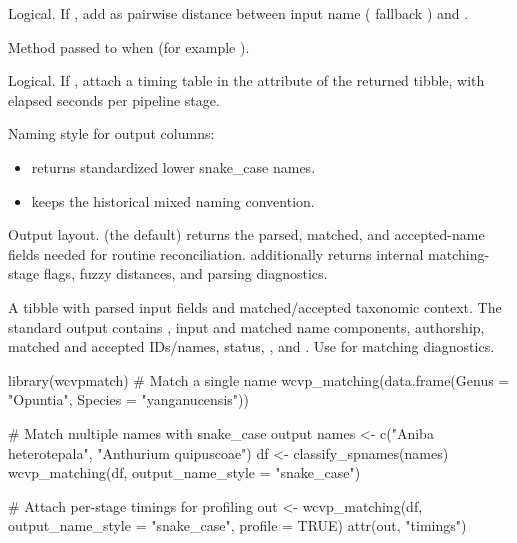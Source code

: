 \documentclass[a4paper]{book}
\begin{document}
\begin{Arguments}
\begin{ldescription}
\begin{itemize}
\end{itemize}


\item[\code{add\_name\_distance}] Logical. If , add
 as pairwise distance between input name
( fallback ) and .

\item[\code{name\_distance\_method}] Method passed to 
when  (for example ).

\item[\code{profile}] Logical. If , attach a timing table in the
 attribute of the returned tibble, with elapsed seconds per
pipeline stage.

\item[\code{output\_name\_style}] Naming style for output columns:
\begin{itemize}

\item{}  returns standardized lower snake\_case names.
\item{}  keeps the historical mixed naming convention.

\end{itemize}


\item[\code{output}] Output layout.  (the default) returns the parsed,
matched, and accepted-name fields needed for routine reconciliation.
 additionally returns internal matching-stage flags, fuzzy
distances, and parsing diagnostics.
\end{ldescription}
\end{Arguments}
%
\begin{Value}
A tibble with parsed input fields and matched/accepted taxonomic
context. The standard output contains , input and matched
name components, authorship, matched and accepted IDs/names, status,
, and . Use  for matching
diagnostics.
\end{Value}
%
\begin{Examples}
\begin{ExampleCode}


library(wcvpmatch)
# Match a single name
wcvp_matching(data.frame(Genus = "Opuntia", Species = "yanganucensis"))

# Match multiple names with snake_case output
names <- c("Aniba heterotepala", "Anthurium quipuscoae")
df <- classify_spnames(names)
wcvp_matching(df, output_name_style = "snake_case")

# Attach per-stage timings for profiling
out <- wcvp_matching(df, output_name_style = "snake_case", profile = TRUE)
attr(out, "timings")


\end{ExampleCode}
\end{Examples}
\end{document}

